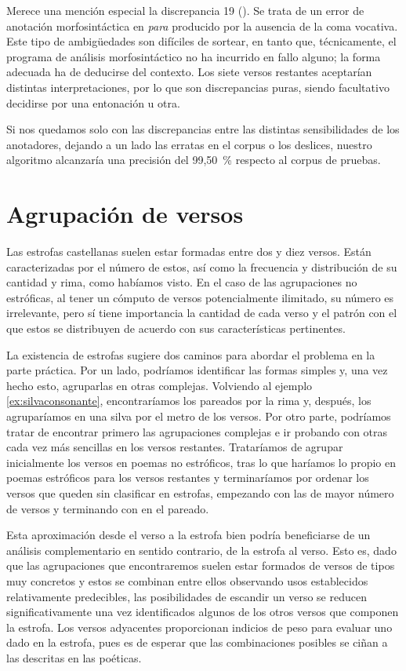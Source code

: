 Merece una mención especial la discrepancia 19 (). Se trata de un error de anotación morfosintáctica en \textit{para} producido por la ausencia de la coma vocativa. Este tipo de ambigüedades son difíciles de sortear, en tanto que, técnicamente, el programa de análisis morfosintáctico no ha incurrido en fallo alguno; la forma adecuada ha de deducirse del contexto. Los siete versos restantes aceptarían distintas interpretaciones, por lo que son discrepancias puras, siendo facultativo decidirse por una entonación u otra. 

Si nos quedamos solo con las discrepancias entre las distintas sensibilidades de los anotadores, dejando a un lado las erratas en el corpus o los deslices, nuestro algoritmo alcanzaría una precisión del 99{,}50~\% respecto al corpus de pruebas.

\section{Agrupación de versos}
Las estrofas castellanas suelen estar formadas entre dos y diez versos. Están caracterizadas por el número de estos, así como la frecuencia y distribución de su cantidad y rima, como habíamos visto. En el caso de las agrupaciones no estróficas, al tener un cómputo de versos potencialmente ilimitado, su número es irrelevante, pero sí tiene importancia la cantidad de cada verso y el patrón con el que estos se distribuyen de acuerdo con sus características pertinentes.

La existencia de estrofas sugiere dos caminos para abordar el problema en la parte práctica. Por un lado, podríamos identificar las formas simples y, una vez hecho esto, agruparlas en otras complejas. Volviendo al ejemplo \ref{ex:silvaconsonante}, encontraríamos los pareados por la rima y, después, los agruparíamos en una silva por el metro de los versos. Por otro parte, podríamos tratar de encontrar primero las agrupaciones complejas e ir probando con otras cada vez más sencillas en los versos restantes. Trataríamos de agrupar inicialmente los versos en poemas no estróficos, tras lo que haríamos lo propio en poemas estróficos para los versos restantes y terminaríamos por ordenar los versos que queden sin clasificar en estrofas, empezando con las de mayor número de versos y terminando con en el pareado.

Esta aproximación desde el verso a la estrofa bien podría beneficiarse de un análisis complementario en sentido contrario, de la estrofa al verso. Esto es, dado que las agrupaciones que encontraremos suelen estar formados de versos de tipos muy concretos y estos se combinan entre ellos observando usos establecidos relativamente predecibles, las posibilidades de escandir un verso se reducen significativamente una vez identificados algunos de los otros versos que componen la estrofa. Los versos adyacentes proporcionan indicios de peso para evaluar uno dado en la estrofa, pues es de esperar que las combinaciones posibles se ciñan a las descritas en las poéticas.

